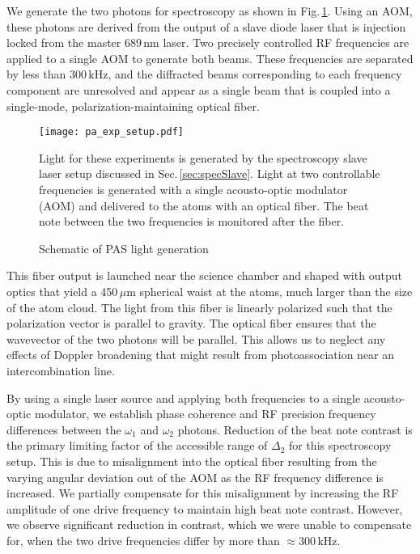 We generate the two photons for spectroscopy as shown in Fig.\,\ref{fig:pas_light_gen}.
Using an AOM, these photons are derived from the output of a slave diode laser that is injection locked from the master $689\,\text{nm}$ laser.
Two precisely controlled RF frequencies are applied to a single AOM to generate both beams.
These frequencies are separated by less than $300\,\text{kHz}$, and the diffracted beams corresponding to each frequency component are unresolved and appear as a single beam that is coupled into a single-mode, polarization-maintaining optical fiber.
	\begin{figure} 
		\centerline{
		\texttt{[image: pa\_exp\_setup.pdf]}}
		\caption{Schematic of PAS light generation}{Light for these experiments is generated by the spectroscopy slave laser setup discussed in Sec.\,\ref{sec:specSlave}. Light at two controllable frequencies is generated with a single acousto-optic modulator (AOM) and delivered to the atoms with an optical fiber. The beat note between the two frequencies is monitored after the fiber.}
		\label{fig:pas_light_gen}
	\end{figure} 
This fiber output is launched near the science chamber and shaped with output optics that yield a 450\,$\mu$m spherical waist at the atoms, much larger than the size of the atom cloud.
The light from this fiber is linearly polarized such that the polarization vector is parallel to gravity.
The optical fiber ensures that the wavevector of the two photons will be parallel.
This allows us to neglect any effects of Doppler broadening that might result from photoassociation near an intercombination line.

By using a single laser source and applying both frequencies to a single acousto-optic modulator, we establish phase coherence and RF precision frequency differences between the $\omega_1$ and $\omega_2$ photons.
Reduction of the beat note contrast is the primary limiting factor of the accessible range of $\Delta_2$ for this spectroscopy setup.
This is due to misalignment into the optical fiber resulting from the varying angular deviation out of the AOM as the RF frequency difference is increased.
We partially compensate for this misalignment by increasing the RF amplitude of one drive frequency to maintain high beat note contrast.
However, we observe significant reduction in contrast, which we were unable to compensate for, when the two drive frequencies differ by more than $\approx\!300\,\text{kHz}$. 

